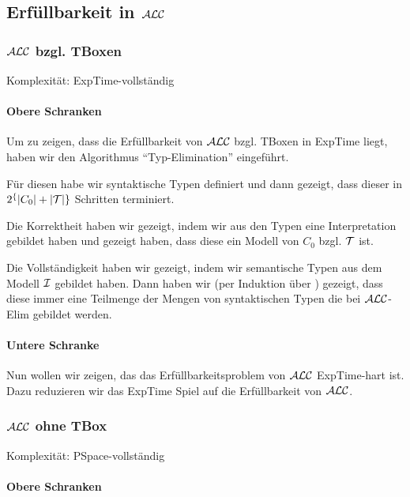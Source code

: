 \subsection{Erfüllbarkeit in \texorpdfstring{$\mathcal{A}\mathcal{L}\mathcal{C}$}{ALC}}

\subsubsection{\texorpdfstring{$\mathcal{A}\mathcal{L}\mathcal{C}$}{ALC} bzgl. TBoxen}

Komplexität: ExpTime-vollständig

\paragraph{Obere Schranken}

Um zu zeigen, dass die Erfüllbarkeit von $\mathcal{A}\mathcal{L}\mathcal{C}$ bzgl. TBoxen in ExpTime liegt, haben wir den Algorithmus \enquote{Typ-Elimination} eingeführt.

Für diesen habe wir syntaktische Typen definiert und dann gezeigt, dass dieser in $2^\{|C_0|+|\mathcal{T}|\}$ Schritten terminiert.

Die Korrektheit haben wir gezeigt, indem wir aus den Typen eine Interpretation gebildet haben und gezeigt haben, dass diese ein Modell von $C_0$ bzgl. $\mathcal{T}$ ist.

Die Vollständigkeit haben wir gezeigt, indem wir semantische Typen aus dem Modell $\mathcal{I}$ gebildet haben. Dann haben wir (per Induktion über ) gezeigt, dass diese immer eine Teilmenge der Mengen von syntaktischen Typen die bei $\mathcal{A}\mathcal{L}\mathcal{C}$-Elim gebildet werden.

\paragraph{Untere Schranke}

Nun wollen wir zeigen, das das Erfüllbarkeitsproblem von $\mathcal{A}\mathcal{L}\mathcal{C}$ ExpTime-hart ist. Dazu reduzieren wir das ExpTime Spiel auf die Erfüllbarkeit von $\mathcal{A}\mathcal{L}\mathcal{C}$.

\subsubsection{\texorpdfstring{$\mathcal{A}\mathcal{L}\mathcal{C}$}{ALC} ohne TBox}

Komplexität: PSpace-vollständig

\paragraph{Obere Schranken}


